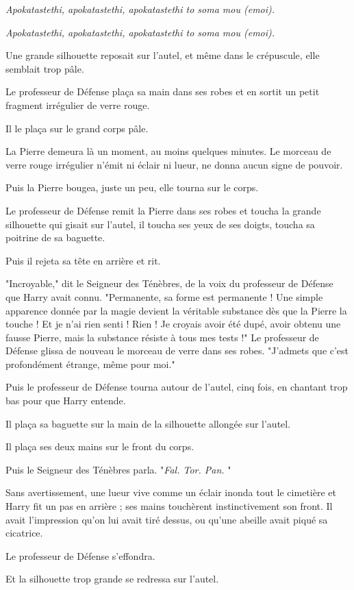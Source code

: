 \emph{Apokatastethi, apokatastethi, apokatastethi to soma mou (emoi).} 

\emph{Apokatastethi, apokatastethi, apokatastethi to soma mou (emoi).} 

Une grande silhouette reposait sur l'autel, et même dans le crépuscule, elle semblait trop pâle.

Le professeur de Défense plaça sa main dans ses robes et en sortit un petit fragment irrégulier de verre rouge.

Il le plaça sur le grand corps pâle.

La Pierre demeura là un moment, au moins quelques minutes. Le morceau de verre rouge irrégulier n'émit ni éclair ni lueur, ne donna aucun signe de pouvoir.

Puis la Pierre bougea, juste un peu, elle tourna sur le corps.

Le professeur de Défense remit la Pierre dans ses robes et toucha la grande silhouette qui gisait sur l'autel, il toucha ses yeux de ses doigts, toucha sa poitrine de sa baguette.

Puis il rejeta sa tête en arrière et rit.

"Incroyable," dit le Seigneur des Ténèbres, de la voix du professeur de Défense que Harry avait connu. "Permanente, sa forme est permanente ! Une simple apparence donnée par la magie devient la véritable substance dès que la Pierre la touche ! Et je n'ai rien senti ! Rien ! Je croyais avoir été dupé, avoir obtenu une fausse Pierre, mais la substance résiste à tous mes tests !" Le professeur de Défense glissa de nouveau le morceau de verre dans ses robes. "J'admets que c'est profondément étrange, même pour moi."

Puis le professeur de Défense tourna autour de l'autel, cinq fois, en chantant trop bas pour que Harry entende.

Il plaça sa baguette sur la main de la silhouette allongée sur l'autel.

Il plaça ses deux mains sur le front du corps.

Puis le Seigneur des Ténèbres parla. "\emph{Fal. Tor. Pan.} "

Sans avertissement, une lueur vive comme un éclair inonda tout le cimetière et Harry fit un pas en arrière ; ses mains touchèrent instinctivement son front. Il avait l'impression qu'on lui avait tiré dessus, ou qu'une abeille avait piqué sa cicatrice.

Le professeur de Défense s'effondra.

Et la silhouette trop grande se redressa sur l'autel.

